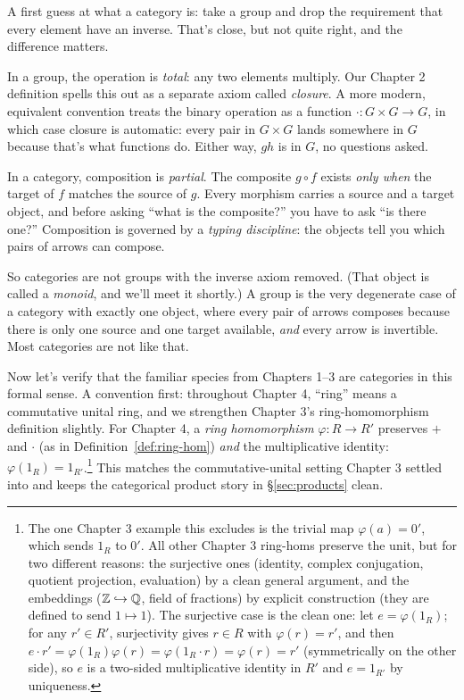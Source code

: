 \begin{remark}
A first guess at what a category is: take a group and drop the requirement that
every element have an inverse. That's close, but not quite right, and the difference
matters.

In a group, the operation is \textit{total}: any two elements multiply. Our
Chapter 2 definition spells this out as a separate axiom called
\textit{closure}. A more modern, equivalent convention treats the binary
operation as a function $\cdot : G \times G \to G$, in which case closure is
automatic: every pair in $G \times G$ lands somewhere in $G$ because that's
what functions do. Either way, $gh$ is in $G$, no questions asked.

In a category, composition is \textit{partial}. The composite $g \circ f$ exists
\textit{only when} the target of $f$ matches the source of $g$. Every morphism
carries a source and a target object, and before asking ``what is the composite?''
you have to ask ``is there one?'' Composition is governed by a \textit{typing
discipline}: the objects tell you which pairs of arrows can compose.

So categories are not groups with the inverse axiom removed. (That object is called a
\textit{monoid}, and we'll meet it shortly.) A group is the very degenerate case of
a category with exactly one object, where every pair of arrows composes because there
is only one source and one target available, \textit{and} every arrow is invertible.
Most categories are not like that.
\end{remark}

\noindent Now let's verify that the familiar species from Chapters 1--3 are categories in
this formal sense. A convention first: throughout Chapter 4, ``ring'' means a
commutative unital ring, and we strengthen Chapter 3's ring-homomorphism definition
slightly. For Chapter 4, a \textit{ring homomorphism} $\varphi : R \to R'$ preserves
$+$ and $\cdot$ (as in Definition~\ref{def:ring-hom}) \textit{and} the multiplicative
identity: $\varphi(1_R) = 1_{R'}$.\footnote{The one Chapter 3 example this excludes
is the trivial map $\varphi(a) = 0'$, which sends $1_R$ to $0'$. All other
Chapter 3 ring-homs preserve the unit, but for two different reasons: the surjective
ones (identity, complex conjugation, quotient projection, evaluation) by a clean
general argument, and the embeddings (${\mathbb{Z}} \hookrightarrow {\mathbb{Q}}$, field of fractions)
by explicit construction (they are defined to send $1 \mapsto 1$). The surjective
case is the clean one: let $e = \varphi(1_R)$; for any $r' \in R'$, surjectivity
gives $r \in R$ with $\varphi(r) = r'$, and then
$e \cdot r' = \varphi(1_R)\varphi(r) = \varphi(1_R \cdot r) = \varphi(r) = r'$
(symmetrically on the other side), so $e$ is a two-sided multiplicative identity
in $R'$ and $e = 1_{R'}$ by uniqueness.} This matches the commutative-unital
setting Chapter 3 settled into and keeps the categorical product story in \S\ref{sec:products} clean.

